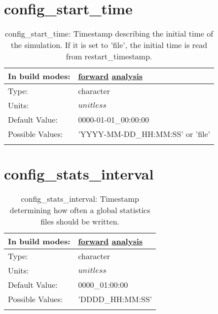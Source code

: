 \section[config\_start\_time]{config\_start\_time}
\label{sec:nm_sec_config_start_time}
\begin{center}
\begin{longtable}{| p{2.0in} || p{4.0in} |}
    \hline
    In build modes: & \hyperref[subsec:forward_nm_tab_time_management]{forward} \hyperref[subsec:analysis_nm_tab_time_management]{analysis} \\
    \hline
    Type: & character \\
    \hline
    Units: & $unitless$ \\
    \hline
    Default Value: & 0000-01-01\_00:00:00 \\
    \hline
    Possible Values: & 'YYYY-MM-DD\_HH:MM:SS' or 'file' \\
    \hline
    \caption{config\_start\_time: Timestamp describing the initial time of the simulation. If it is set to 'file', the initial time is read from restart\_timestamp.}
\end{longtable}
\end{center}
\section[config\_stats\_interval]{config\_stats\_interval}
\label{sec:nm_sec_config_stats_interval}
\begin{center}
\begin{longtable}{| p{2.0in} || p{4.0in} |}
    \hline
    In build modes: & \hyperref[subsec:forward_nm_tab_io]{forward} \hyperref[subsec:analysis_nm_tab_io]{analysis} \\
    \hline
    Type: & character \\
    \hline
    Units: & $unitless$ \\
    \hline
    Default Value: & 0000\_01:00:00 \\
    \hline
    Possible Values: & 'DDDD\_HH:MM:SS' \\
    \hline
    \caption{config\_stats\_interval: Timestamp determining how often a global statistics files should be written.}
\end{longtable}
\end{center}
